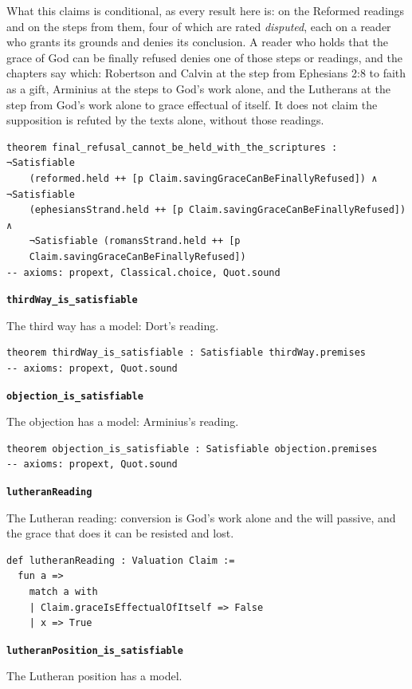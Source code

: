 \documentclass[11pt]{article}
\begin{document}
What this claims is conditional, as every result here is: on the Reformed readings and on the steps from them, four of which are rated \emph{disputed}, each on a reader who grants its grounds and denies its conclusion. A reader who holds that the grace of God can be finally refused denies one of those steps or readings, and the chapters say which: Robertson and Calvin at the step from Ephesians 2:8 to faith as a gift, Arminius at the steps to God’s work alone, and the Lutherans at the step from God’s work alone to grace effectual of itself. It does not claim the supposition is refuted by the texts alone, without those readings.

{\small\begin{verbatim}
theorem final_refusal_cannot_be_held_with_the_scriptures : ¬Satisfiable
    (reformed.held ++ [p Claim.savingGraceCanBeFinallyRefused]) ∧ ¬Satisfiable
    (ephesiansStrand.held ++ [p Claim.savingGraceCanBeFinallyRefused]) ∧
    ¬Satisfiable (romansStrand.held ++ [p
    Claim.savingGraceCanBeFinallyRefused])
-- axioms: propext, Classical.choice, Quot.sound
\end{verbatim}}
\par\medskip\noindent\textbf{\texttt{third\allowbreak{}Way\_\allowbreak{}is\_\allowbreak{}satisfiable}}\par\nobreak\noindent
The third way has a model: Dort’s reading.

{\small\begin{verbatim}
theorem thirdWay_is_satisfiable : Satisfiable thirdWay.premises
-- axioms: propext, Quot.sound
\end{verbatim}}
\par\medskip\noindent\textbf{\texttt{objection\_\allowbreak{}is\_\allowbreak{}satisfiable}}\par\nobreak\noindent
The objection has a model: Arminius’s reading.

{\small\begin{verbatim}
theorem objection_is_satisfiable : Satisfiable objection.premises
-- axioms: propext, Quot.sound
\end{verbatim}}
\par\medskip\noindent\textbf{\texttt{lutheran\allowbreak{}Reading}}\par\nobreak\noindent
The Lutheran reading: conversion is God’s work alone and the will passive, and the grace that does it can be resisted and lost.

{\small\begin{verbatim}
def lutheranReading : Valuation Claim :=
  fun a =>
    match a with
    | Claim.graceIsEffectualOfItself => False
    | x => True
\end{verbatim}}
\par\medskip\noindent\textbf{\texttt{lutheran\allowbreak{}Position\_\allowbreak{}is\_\allowbreak{}satisfiable}}\par\nobreak\noindent
The Lutheran position has a model.
\end{document}
